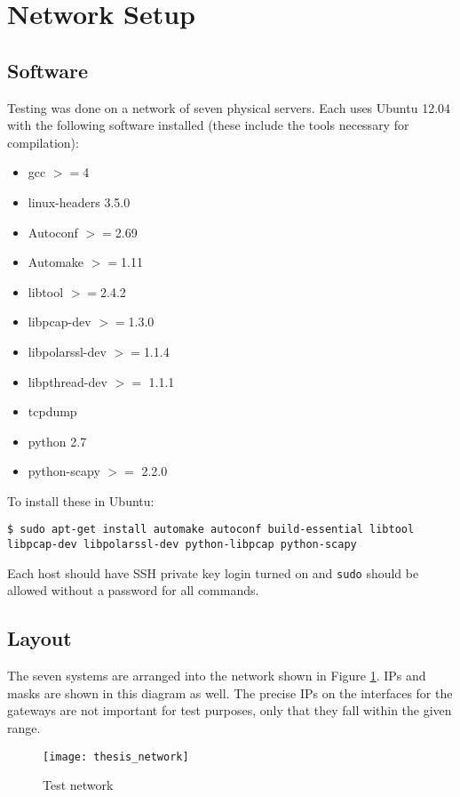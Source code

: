 \documentclass{article}
\begin{document}
\section{Network Setup}
\subsection{Software}
\par Testing was done on a network of seven physical servers. Each uses Ubuntu 12.04 with the following software installed (these include the tools necessary for compilation):

\begin{itemize}
\item gcc $>=$4
\item linux-headers 3.5.0
\item Autoconf $>=$2.69
\item Automake $>=$1.11
\item libtool $>=$2.4.2
\item libpcap-dev $>=$1.3.0
\item libpolarssl-dev $>=$1.1.4
\item libpthread-dev $>=$ 1.1.1 
\item tcpdump
\item python 2.7
\item python-scapy $>=$ 2.2.0
\end{itemize}

\par To install these in Ubuntu:
\begin{lstlisting}
$ sudo apt-get install automake autoconf build-essential libtool libpcap-dev libpolarssl-dev python-libpcap python-scapy
\end{lstlisting}

\par Each host should have SSH private key login turned on and \texttt{sudo} should be allowed without a password for all commands.

\subsection{Layout}
\par The seven systems are arranged into the network shown in Figure \ref{fig:layout}. IPs and masks are shown in this diagram as well. The precise IPs on the interfaces for the gateways are not important for test purposes, only that they fall within the given range.

\begin{figure}
\caption{Test network}
\label{fig:layout}
\centering
\texttt{[image: thesis\_network]}
\end{figure}
\end{document}
